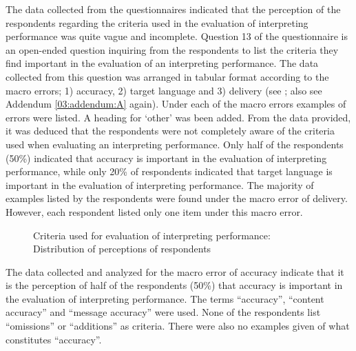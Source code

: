\documentclass[output=paper]{langsci/langscibook}
\begin{document}
The data collected from the questionnaires indicated that the perception of the respondents regarding the criteria used in the evaluation of interpreting performance was quite vague and incomplete. Question 13 of the questionnaire is an open-ended question inquiring from the respondents to list the criteria they find important in the evaluation of an interpreting performance. The data collected from this question was arranged in tabular format according to the macro errors; 1) accuracy, 2) target language and 3) delivery (see ; also see Addendum \ref{03:addendum:A} again). Under each of the macro errors examples of errors were listed. A heading for ‘other’ was been added. From the data provided, it was deduced that the respondents were not completely aware of the criteria used when evaluating an interpreting performance. Only half of the respondents (50\%) indicated that accuracy is important in the evaluation of interpreting performance, while only 20\% of respondents indicated that target language is important in the evaluation of interpreting performance. The majority of examples listed by the respondents were found under the macro error of delivery. However, each respondent listed only one item under this macro error. 

\begin{figure}
\caption{\label{fig:deysel:2}Criteria used for evaluation of interpreting performance: Distribution of perceptions of respondents}
\end{figure}

The data collected and analyzed for the macro error of accuracy indicate that it is the perception of half of the respondents (50\%) that accuracy is important in the evaluation of interpreting performance. The terms “accuracy”, “content accuracy” and “message accuracy” were used. None of the respondents list “omissions” or “additions” as criteria. There were also no examples given of what constitutes “accuracy”.  
\end{document}
